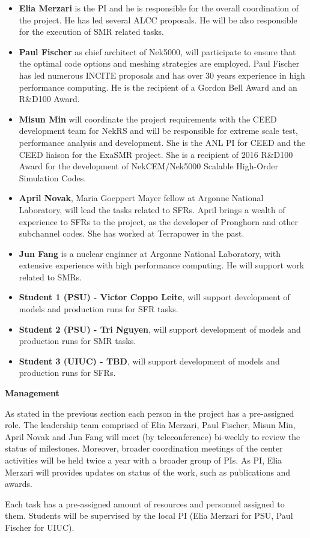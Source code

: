 \documentclass[11pt,letterpaper,english]{article}
\begin{document}
\begin{flushleft}
\vspace{-.15in}
\begin{itemize}
\item \textbf{Elia Merzari} is the PI and he is responsible for the overall coordination of the project. He has led several ALCC proposals. He will be also responsible for the execution of SMR related tasks.
\item \textbf{Paul Fischer} as chief architect of Nek5000, will participate to ensure that the optimal code options and meshing strategies are employed. Paul Fischer has led numerous INCITE proposals and has over 30 years experience in high performance computing. He is the recipient of a Gordon Bell Award and an R\&D100 Award.
\item \textbf{Misun Min} will coordinate the project requirements with the CEED development team for NekRS and will be responsible for extreme scale test, performance analysis and development.
She is the ANL PI for CEED and the CEED liaison for the ExaSMR project. She is a recipient of 2016 R\&D100 Award for the development of NekCEM/Nek5000 Scalable High-Order Simulation Codes.
\item \textbf{April Novak}, Maria Goeppert Mayer fellow at Argonne National Laboratory, will lead the tasks related to SFRs. April brings a wealth of experience to SFRs to the project, as the developer of Pronghorn and other subchannel codes. She has worked at Terrapower in the past.
\item \textbf{Jun Fang} is a nuclear enginner at Argonne National Laboratory, with extensive experience with high performance computing.  He will support work related to SMRs.
\item \textbf{Student 1 (PSU) - Victor Coppo Leite}, will support development of models and production runs for SFR tasks.
\item \textbf{Student 2 (PSU) - Tri Nguyen}, will support development of models and production runs for SMR tasks.
\item \textbf{Student 3 (UIUC) - TBD}, will support development of models and production runs for SFRs.
\end{itemize}

{\noindent \bf  {Management}}

As stated in the previous section each person in the project has a pre-assigned role. The leadership team comprised of Elia Merzari, Paul Fischer, Misun Min, April Novak and Jun Fang will meet (by teleconference) bi-weekly to review the status of milestones.  Moreover, broader coordination meetings of the center activities will be held twice a year with a broader group of PIs. As PI, Elia Merzari will provides updates on status of the work, such as publications and awards.

Each task has a pre-assigned amount of resources and personnel assigned to them. Students will be supervised by the local PI (Elia Merzari for PSU, Paul Fischer for UIUC).

\end{flushleft}
\end{document}
